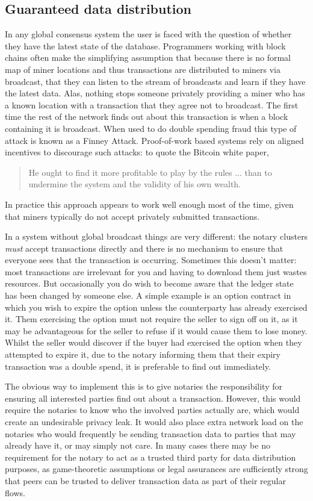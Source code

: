 \documentclass{article}
\begin{document}
\subsection{Guaranteed data distribution}

In any global consensus system the user is faced with the question of whether they have the latest state of the database.
Programmers working with block chains often make the simplifying assumption that because there is no formal map
of miner locations and thus transactions are distributed to miners via broadcast, that they can listen to the
stream of broadcasts and learn if they have the latest data. Alas, nothing stops someone privately providing a
miner who has a known location with a transaction that they agree not to broadcast. The first time the rest of
the network finds out about this transaction is when a block containing it is broadcast. When used to do double
spending fraud this type of attack is known as a Finney Attack\cite{FinneyAttack}. Proof-of-work based systems
rely on aligned incentives to discourage such attacks: to quote the Bitcoin white paper, \blockquote{He ought to
find it more profitable to play by the rules ... than to undermine the system and the validity of his own wealth.}
In practice this approach appears to work well enough most of the time, given that miners typically do not accept
privately submitted transactions.

In a system without global broadcast things are very different: the notary clusters \emph{must} accept transactions
directly and there is no mechanism to ensure that everyone sees that the transaction is occurring. Sometimes this
doesn't matter: most transactions are irrelevant for you and having to download them just wastes resources. But
occasionally you do wish to become aware that the ledger state has been changed by someone else. A simple example
is an option contract in which you wish to expire the option unless the counterparty has already exercised it. Them
exercising the option must not require the seller to sign off on it, as it may be advantageous for the seller to refuse
if it would cause them to lose money. Whilst the seller would discover if the buyer had exercised the option when they
attempted to expire it, due to the notary informing them that their expiry transaction was a double spend, it is
preferable to find out immediately.

The obvious way to implement this is to give notaries the responsibility for ensuring all interested parties find out
about a transaction. However, this would require the notaries to know who the involved parties actually are, which
would create an undesirable privacy leak. It would also place extra network load on the notaries who would frequently
be sending transaction data to parties that may already have it, or may simply not care. In many cases there may be
no requirement for the notary to act as a trusted third party for data distribution purposes, as game-theoretic
assumptions or legal assurances are sufficiently strong that peers can be trusted to deliver transaction data as part
of their regular flows.
\end{document}
